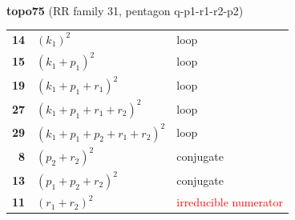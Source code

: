 \documentclass[10pt]{article}
\begin{document}
\begin{minipage}[t]{0.48\textwidth}
{}\\[2mm]\textbf{topo75} (RR family 31, pentagon q-p1-r1-r2-p2)\\[2pt]{\footnotesize\begin{tabular}{@{}r@{\ \ }l@{\ \ }l@{}}\textbf{14} & $(k_1)^2$ & loop\\
\textbf{15} & $(k_1+p_1)^2$ & loop\\
\textbf{19} & $(k_1+p_1+r_1)^2$ & loop\\
\textbf{27} & $(k_1+p_1+r_1+r_2)^2$ & loop\\
\textbf{29} & $(k_1+p_1+p_2+r_1+r_2)^2$ & loop\\
\textbf{8} & $(p_2+r_2)^2$ & conjugate\\
\textbf{13} & $(p_1+p_2+r_2)^2$ & conjugate\\
\textbf{11} & $(r_1+r_2)^2$ & \textcolor{red}{irreducible numerator}\\\end{tabular}}\end{minipage}\hfill%
\end{document}
